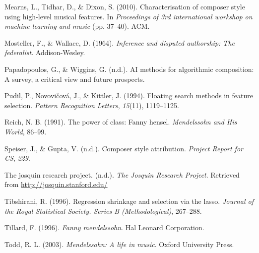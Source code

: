 \documentclass[12pt,twoside]{reedthesis}
\theoremstyle{definition}
\theoremstyle{definition}
\theoremstyle{definition}
\theoremstyle{remark}
\begin{document}
\hypertarget{ref-mearns2010}{}
Mearns, L., Tidhar, D., \& Dixon, S. (2010). Characterisation of
composer style using high-level musical features. In \emph{Proceedings
of 3rd international workshop on machine learning and music} (pp.
37--40). ACM.

\hypertarget{ref-mosteller1964inference}{}
Mosteller, F., \& Wallace, D. (1964). \emph{Inference and disputed
authorship: The federalist}. Addison-Wesley.

\hypertarget{ref-papadopoulosai}{}
Papadopoulos, G., \& Wiggins, G. (n.d.). AI methods for algorithmic
composition: A survey, a critical view and future prospects.

\hypertarget{ref-pudil1994floating}{}
Pudil, P., Novovičová, J., \& Kittler, J. (1994). Floating search
methods in feature selection. \emph{Pattern Recognition Letters},
\emph{15}(11), 1119--1125.

\hypertarget{ref-reich1991}{}
Reich, N. B. (1991). The power of class: Fanny hensel. \emph{Mendelssohn
and His World}, 86--99.

\hypertarget{ref-CompStyleAttri}{}
Speiser, J., \& Gupta, V. (n.d.). Composer style attribution.
\emph{Project Report for CS}, \emph{229}.

\hypertarget{ref-jrp}{}
The josquin research project. (n.d.). \emph{The Josquin Research
Project}. Retrieved from \url{http://josquin.stanford.edu/}

\hypertarget{ref-lasso}{}
Tibshirani, R. (1996). Regression shrinkage and selection via the lasso.
\emph{Journal of the Royal Statistical Society. Series B
(Methodological)}, 267--288.

\hypertarget{ref-tillard1996}{}
Tillard, F. (1996). \emph{Fanny mendelssohn}. Hal Leonard Corporation.

\hypertarget{ref-todd2003}{}
Todd, R. L. (2003). \emph{Mendelssohn: A life in music}. Oxford
University Press.


\end{document}

